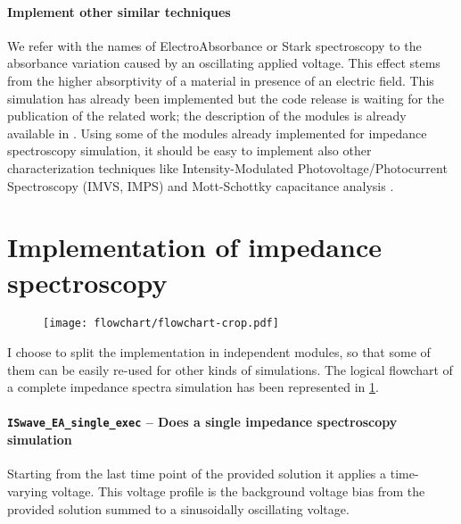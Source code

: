 \paragraph{Implement other similar techniques}
We refer with the names of ElectroAbsorbance or Stark spectroscopy to the absorbance variation caused by an oscillating applied voltage.
This effect stems from the higher absorptivity of a material in presence of an electric field.
This simulation has already been implemented but the code release is waiting for the publication of the related work; the description of the modules is already available in .
Using some of the modules already implemented for impedance spectroscopy simulation, it should be easy to implement also other characterization techniques like Intensity-Modulated Photovoltage/Photocurrent Spectroscopy (IMVS, IMPS) \cite{Pockett2015,Guillen2014} and Mott-Schottky capacitance analysis \cite{Almora2016}.



\section{Implementation of impedance spectroscopy}

	\begin{figure}%
		\centering
		\texttt{[image: flowchart/flowchart-crop.pdf]}
		\label{fig:impedance_flowchart}
	\end{figure}

	I choose to split the implementation in independent modules, so that some of them can be easily re-used for other kinds of simulations.
	The logical flowchart of a complete impedance spectra simulation has been represented in \cref{fig:impedance_flowchart}.


	\paragraph{\texttt{ISwave\_EA\_single\_exec} -- Does a single impedance spectroscopy simulation}
	Starting from the last time point of the provided solution it applies a time-varying voltage.
	This voltage profile is the background voltage bias from the provided solution summed to a sinusoidally oscillating voltage.

